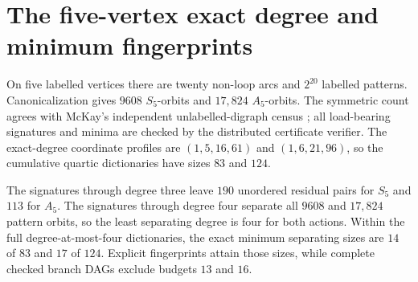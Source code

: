 \section{The five-vertex exact degree and minimum fingerprints}
\label{sec:n5}

On five labelled vertices there are twenty non-loop arcs and $2^{20}$ labelled
patterns.  Canonicalization gives $9608$ $S_5$-orbits and $17{,}824$
$A_5$-orbits.  The symmetric count agrees with McKay's independent
unlabelled-digraph census \cite{McKayDigraphData}; all load-bearing signatures
and minima are checked by the distributed certificate verifier.  The
exact-degree coordinate profiles are $(1,5,16,61)$ and
$(1,6,21,96)$, so the cumulative quartic dictionaries have sizes $83$ and
$124$.

\begin{theorem}
\label{thm:n5-minimum}
The signatures through degree three leave $190$ unordered residual pairs for
$S_5$ and $113$ for $A_5$.  The signatures through degree four separate all
$9608$ and $17{,}824$ pattern orbits, so the least separating degree is four
for both actions.  Within the full degree-at-most-four dictionaries, the
exact minimum separating sizes are $14$ of $83$ and $17$ of $124$.
Explicit fingerprints attain those sizes, while complete checked branch DAGs
exclude budgets $13$ and $16$.
\end{theorem}

